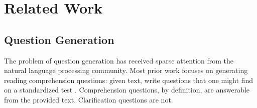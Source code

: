 \documentclass[11pt]{article}
\begin{document}
%
%






\section{Related Work}

\subsection{Question Generation}

The problem of question generation has received sparse attention from the natural language processing community. Most prior work focuses on generating reading comprehension questions:  given text, write questions that one might find on a standardized test \cite{vanderwende2008importance,heilman2011automatic,rus2011question,olney2012question}.  Comprehension questions, by definition, are answerable from the provided text. Clarification questions are not.  
\end{document}
